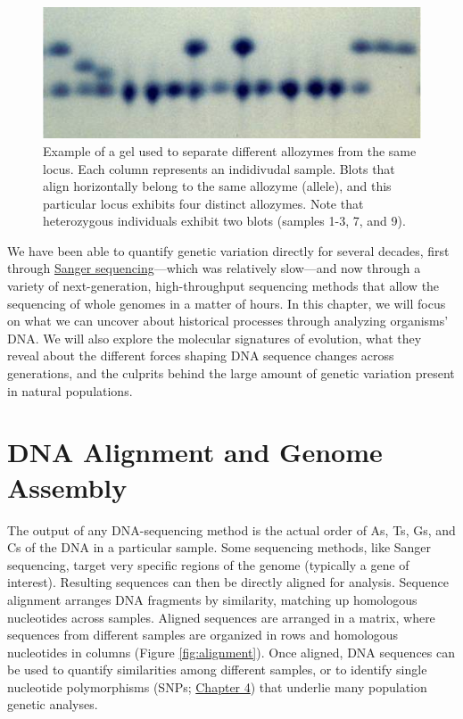 \documentclass[
]{book}
\begin{document}
\begin{figure}
\includegraphics[width=1\linewidth]{images/allozyme} \caption{Example of a gel used to separate different allozymes from the same locus. Each column represents an indidivudal sample. Blots that align horizontally belong to the same allozyme (allele), and this particular locus exhibits four distinct allozymes. Note that heterozygous individuals exhibit two blots (samples 1-3, 7, and 9).}\label{fig:allozyme}
\end{figure}

We have been able to quantify genetic variation directly for several decades, first through \href{https://en.wikipedia.org/wiki/Sanger_sequencing}{Sanger sequencing}---which was relatively slow---and now through a variety of next-generation, high-throughput sequencing methods that allow the sequencing of whole genomes in a matter of hours. In this chapter, we will focus on what we can uncover about historical processes through analyzing organisms' DNA. We will also explore the molecular signatures of evolution, what they reveal about the different forces shaping DNA sequence changes across generations, and the culprits behind the large amount of genetic variation present in natural populations.

\hypertarget{dna-alignment-and-genome-assembly}{%
\section{DNA Alignment and Genome Assembly}\label{dna-alignment-and-genome-assembly}}

The output of any DNA-sequencing method is the actual order of As, Ts, Gs, and Cs of the DNA in a particular sample. Some sequencing methods, like Sanger sequencing, target very specific regions of the genome (typically a gene of interest). Resulting sequences can then be directly aligned for analysis. Sequence alignment arranges DNA fragments by similarity, matching up homologous nucleotides across samples. Aligned sequences are arranged in a matrix, where sequences from different samples are organized in rows and homologous nucleotides in columns (Figure \ref{fig:alignment}). Once aligned, DNA sequences can be used to quantify similarities among different samples, or to identify single nucleotide polymorphisms (SNPs; \href{https://www.k-state.edu/biology/p2e/the-raw-materials-for-evolution.html\#quantifying-genetic-variation}{Chapter 4}) that underlie many population genetic analyses.
\end{document}
